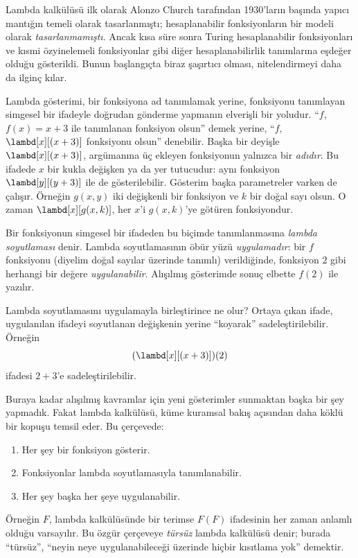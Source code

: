 


Lambda kalkülüsü ilk olarak Alonzo Church tarafından 1930'ların başında
yapıcı mantığın temeli olarak tasarlanmıştı; hesaplanabilir fonksiyonların
bir modeli olarak \emph{tasarlanmamıştı}. Ancak kısa süre sonra Turing
hesaplanabilir fonksiyonları ve kısmi özyinelemeli fonksiyonlar gibi diğer
hesaplanabilirlik tanımlarına eşdeğer olduğu gösterildi. Bunun başlangıçta
biraz şaşırtıcı olması, nitelendirmeyi daha da ilginç kılar.

Lambda gösterimi, bir fonksiyona ad tanımlamak yerine, fonksiyonu tanımlayan
simgesel bir ifadeyle doğrudan gönderme yapmanın elverişli bir yoludur.
``$f$, $f(x)=x+3$ ile tanımlanan fonksiyon olsun'' demek yerine, ``$f$,
$\lambd[x][(x+3)]$ fonksiyonu olsun'' denebilir. Başka bir deyişle
$\lambd[x][(x+3)]$, argümanına üç ekleyen fonksiyonun yalnızca bir
\emph{adıdır}. Bu ifadede $x$ bir kukla değişken ya da yer tutucudur: aynı
fonksiyon $\lambd[y][(y+3)]$ ile de gösterilebilir. Gösterim başka
parametreler varken de çalışır. Örneğin $g(x,y)$ iki değişkenli bir fonksiyon
ve $k$ bir doğal sayı olsun. O zaman $\lambd[x][g(x,k)]$, her $x$'i
$g(x,k)$'ye götüren fonksiyondur.

Bir fonksiyonun simgesel bir ifadeden bu biçimde tanımlanmasına
\emph{lambda soyutlaması} denir. Lambda soyutlamasının öbür yüzü
\emph{uygulamadır}: bir $f$ fonksiyonu (diyelim doğal sayılar üzerinde
tanımlı) verildiğinde, fonksiyon $2$ gibi herhangi bir değere
\emph{uygulanabilir}. Alışılmış gösterimde sonuç elbette $f(2)$ ile yazılır.

Lambda soyutlamasını uygulamayla birleştirince ne olur? Ortaya çıkan ifade,
uygulanılan ifadeyi soyutlanan değişkenin yerine ``koyarak'' sadeleştirilebilir.
Örneğin
\[
(\lambd[x][(x + 3)])(2)
\]
ifadesi $2+3$'e sadeleştirilebilir.

Buraya kadar alışılmış kavramlar için yeni gösterimler sunmaktan başka bir
şey yapmadık. Fakat lambda kalkülüsü, küme kuramsal bakış açısından daha
köklü bir kopuşu temsil eder. Bu çerçevede:
\begin{enumerate}
\item Her şey bir fonksiyon gösterir.
\item Fonksiyonlar lambda soyutlamasıyla tanımlanabilir.
\item Her şey başka her şeye uygulanabilir.
\end{enumerate}
Örneğin $F$, lambda kalkülüsünde bir terimse $F(F)$ ifadesinin her zaman
anlamlı olduğu varsayılır. Bu özgür çerçeveye \emph{türsüz} lambda kalkülüsü
denir; burada ``türsüz'', ``neyin neye uygulanabileceği üzerinde hiçbir
kısıtlama yok'' demektir.

